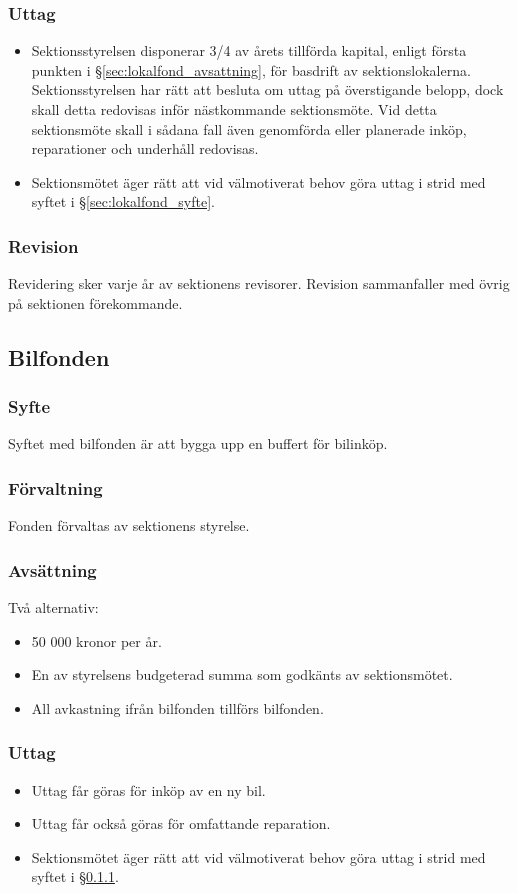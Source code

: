 \documentclass[a4paper, 10pt]{article}
\begin{document}
\subsubsection{Uttag}
\begin{itemize}
\item Sektionsstyrelsen disponerar 3/4 av årets tillförda kapital,
enligt första punkten i \S\ref{sec:lokalfond_avsattning}, för basdrift av sektionslokalerna. Sektionsstyrelsen har rätt att besluta om uttag på överstigande belopp, dock skall detta redovisas inför nästkommande sektionsmöte. Vid detta sektionsmöte skall i sådana fall även genomförda eller planerade inköp, reparationer och underhåll redovisas.
\item Sektionsmötet äger rätt att vid välmotiverat behov göra uttag i strid med syftet i \S\ref{sec:lokalfond_syfte}.
\end{itemize}
\subsubsection{Revision}
Revidering sker varje år av sektionens revisorer. Revision
sammanfaller med övrig på sektionen förekommande.



\subsection{Bilfonden}
\subsubsection{Syfte}
\label{sec:bilfond_syfte}
Syftet med bilfonden är att bygga upp en buffert för bilinköp.
\subsubsection{Förvaltning}
Fonden förvaltas av sektionens styrelse.
\subsubsection{Avsättning}
Två alternativ:
\begin{itemize}
\item 50 000 kronor per år.
\item En av styrelsens budgeterad summa som godkänts av sektionsmötet.
\item All avkastning ifrån bilfonden tillförs bilfonden.
\end{itemize}
\subsubsection{Uttag}
\begin{itemize}
\item Uttag får göras för inköp av en ny bil.
\item Uttag får också göras för omfattande reparation.
\item Sektionsmötet äger rätt att vid välmotiverat behov göra uttag i strid med syftet i \S\ref{sec:bilfond_syfte}.
\end{itemize}
\end{document}
